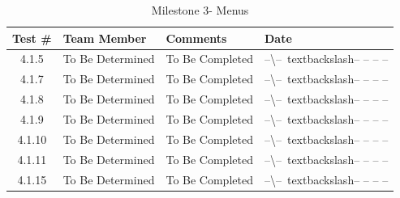 \documentclass{article}
\begin{document}
\begin{table}[H]
\caption{Milestone 3- Menus}
	\begin{tabularx}{\textwidth}{| c | l | X | l |}
	\toprule
	Test \#& Team Member &Comments &Date\\
	\midrule
	4.1.5 & To Be Determined & To Be Completed & --\textbackslash--\
	textbackslash-- -- -- --\\
	4.1.7 & To Be Determined & To Be Completed & --\textbackslash--\
	textbackslash-- -- -- --\\
	4.1.8 & To Be Determined & To Be Completed & --\textbackslash--\
	textbackslash-- -- -- --\\
	4.1.9 & To Be Determined & To Be Completed & --\textbackslash--\
	textbackslash-- -- -- --\\
	4.1.10 & To Be Determined & To Be Completed & --\textbackslash--\
	textbackslash-- -- -- --\\
	4.1.11 & To Be Determined & To Be Completed & --\textbackslash--\
	textbackslash-- -- -- --\\
	4.1.15 & To Be Determined & To Be Completed & --\textbackslash--\
	textbackslash-- -- -- --\\
	\bottomrule
	\end{tabularx}
\end{table}
\end{document}
